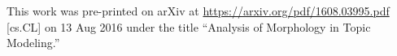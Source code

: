 \documentclass[11pt,letterpaper]{article}
\begin{document}
This work was pre-printed on arXiv at
\url{https://arxiv.org/pdf/1608.03995.pdf} [cs.CL]
on 13 Aug 2016 under the title
``Analysis of Morphology in Topic Modeling.''
\end{document}
